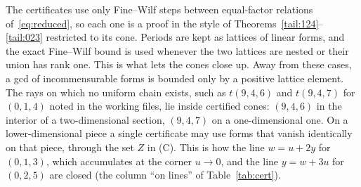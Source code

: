 \begin{remark}
The certificates use only Fine--Wilf steps between equal-factor relations of~\eqref{eq:reduced}, so each one is a proof in the style of Theorems~\ref{tail:124}--\ref{tail:023} restricted to its cone. Periods are kept as lattices of linear forms, and the exact Fine--Wilf bound is used whenever the two lattices are nested or their union has rank one. This is what lets the cones close up. Away from these cases, a gcd of incommensurable forms is bounded only by a positive lattice element. The rays on which no uniform chain exists, such as \(t(9,4,6)\) and \(t(9,4,7)\) for \((0,1,4)\) noted in the working files, lie inside certified cones: \((9,4,6)\) in the interior of a two-dimensional section, \((9,4,7)\) on a one-dimensional one. On a lower-dimensional piece a single certificate may use forms that vanish identically on that piece, through the set \(Z\) in (C). This is how the line \(w=u+2y\) for \((0,1,3)\), which accumulates at the corner \(u\to0\), and the line \(y=w+3u\) for \((0,2,5)\) are closed (the column ``on lines'' of Table~\ref{tab:cert}).
\end{remark}
